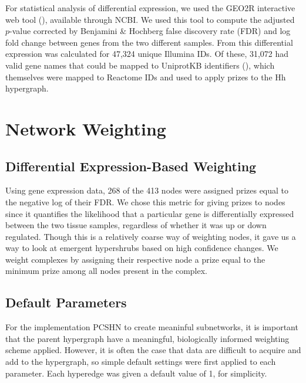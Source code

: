 \documentclass[12pt,twoside]{reedthesis}
\theoremstyle{definition}
\begin{document}
   For statistical analysis of differential expression, we used the GEO2R interactive web tool (\cite{Davis2007}), available through NCBI. We used this tool to compute the adjusted $p$-value corrected by Benjamini \& Hochberg false discovery rate (FDR) and log fold change between genes from the two different samples. From this differential expression was calculated for 47,324 unique Illumina IDs. Of these, 31,072 had valid gene names that could be mapped to UniprotKB identifiers (\cite{TheUniProtConsortium2014}), which themselves were mapped to Reactome IDs and used to apply prizes to the Hh hypergraph.\par

   \section{Network Weighting}

   \subsection{Differential Expression-Based Weighting}

   Using gene expression data, 268 of the 413 nodes were assigned prizes equal to the negative log of their FDR. We chose this metric for giving prizes to nodes since it quantifies the likelihood that a particular gene is differentially expressed between the two tissue samples, regardless of whether it was up or down regulated. Though this is a relatively coarse way of weighting nodes, it gave us a way to look at emergent hypershrubs based on high confidence changes. We weight complexes by assigning their respective node a prize equal to the minimum prize among all nodes present in the complex.\par

   \subsection{Default Parameters}

   For the implementation PCSHN to create meaninful subnetworks, it is important that the parent hypergraph have a meaningful, biologically informed weighting scheme applied. However, it is often the case that data are difficult to acquire and add to the hypergraph, so simple default settings were first applied to each parameter. Each hyperedge was given a default value of 1, for simplicity.\par
\end{document}
